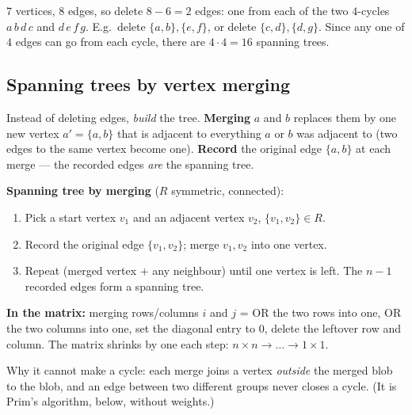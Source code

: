 \documentclass{fkt-notes}
\theoremstyle{definition}
\begin{document}
\begin{example}
  \leavevmode\par\noindent
  \begin{minipage}[c]{0.42\textwidth}
    \centering
  \end{minipage}\hfill
  \begin{minipage}[c]{0.55\textwidth}
    $7$ vertices, $8$ edges, so delete $8-6=2$ edges: one from each of the
    two $4$-cycles $a\,b\,d\,c$ and $d\,e\,f\,g$. E.g.\ delete
    $\{a,b\},\{e,f\}$, or delete $\{c,d\},\{d,g\}$. Since any one of $4$
    edges can go from each cycle, there are $4\cdot4=16$ spanning trees.
  \end{minipage}
\end{example}

\subsection{Spanning trees by vertex merging}
%
Instead of deleting edges, \emph{build} the tree. \textbf{Merging} $a$
and $b$ replaces them by one new vertex $a'=\{a,b\}$ that is adjacent to
everything $a$ or $b$ was adjacent to (two edges to the same vertex
become one). \textbf{Record} the original edge $\{a,b\}$ at each merge ---
the recorded edges \emph{are} the spanning tree.

\begin{rulepar}
  \textbf{Spanning tree by merging} ($R$ symmetric, connected):
  \begin{enumerate}[nosep]
    \item Pick a start vertex $v_1$ and an adjacent vertex $v_2$,
          $\{v_1,v_2\}\in R$.
    \item Record the original edge $\{v_1,v_2\}$; merge $v_1,v_2$ into one
          vertex.
    \item Repeat (merged vertex $+$ any neighbour) until one vertex is
          left. The $n-1$ recorded edges form a spanning tree.
  \end{enumerate}
  \textbf{In the matrix:} merging rows/columns $i$ and $j$ = OR the two
  rows into one, OR the two columns into one, set the diagonal entry to
  $0$, delete the leftover row and column. The matrix shrinks by one each
  step: $n\times n\to\dots\to1\times1$.
\end{rulepar}
Why it cannot make a cycle: each merge joins a vertex \emph{outside} the
merged blob to the blob, and an edge between two different groups never
closes a cycle. (It is Prim's algorithm, below, without weights.)
\end{document}
